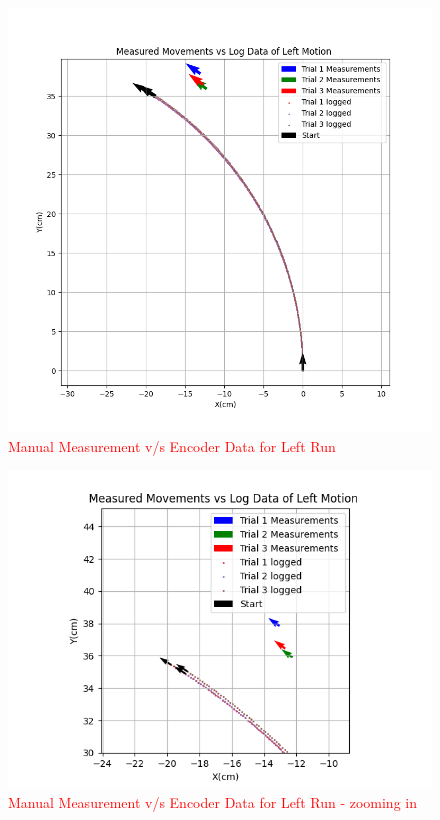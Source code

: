 {        \begin{figure}[!ht] 
            \centering \includegraphics[scale=.60]{"images/experiment_2/Figure_left.png"}
            \caption{\textcolor{red}{Manual Measurement v/s Encoder Data for Left Run}}
            \label{fig:left-manual-encoder}
        \end{figure}
        
        
         \begin{figure}[!ht] 
            \centering \includegraphics[scale=.60]{"images/experiment_2/Figure_left_zoom.png"}
            \caption{\textcolor{red}{Manual Measurement v/s Encoder Data for Left Run - zooming in}}
            \label{fig:left-manual-encoder-zoom}
        \end{figure}
    }
    
    
    

